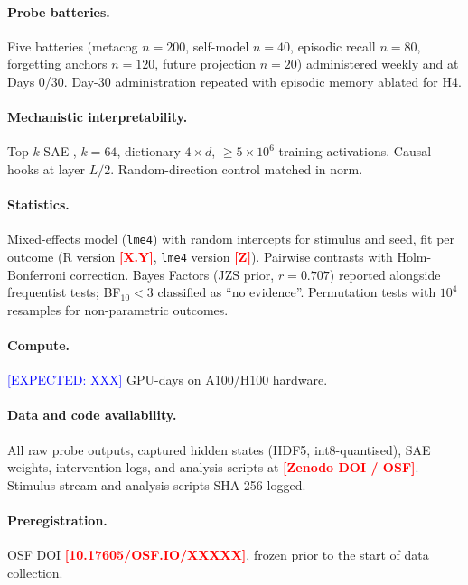 \documentclass[pdflatex,sn-mathphys-num]{sn-jnl}
\newcommand{\PLACE}[1]{\textcolor{red}{\textbf{[#1]}}}
\newcommand{\EXPECT}[1]{\textcolor{blue}{[EXPECTED: #1]}}
\theoremstyle{thmstyleone}
\theoremstyle{thmstylethree}
\begin{document}
\paragraph{Probe batteries.} Five batteries (metacog $n=200$, self-model $n=40$, episodic recall $n=80$, forgetting anchors $n=120$, future projection $n=20$) administered weekly and at Days 0/30. Day-30 administration repeated with episodic memory ablated for H4.

\paragraph{Mechanistic interpretability.} Top-$k$ SAE \cite{templeton2024scaling}, $k=64$, dictionary $4\times d$, $\geq 5{\times}10^6$ training activations. Causal hooks at layer $L/2$. Random-direction control matched in norm.

\paragraph{Statistics.} Mixed-effects model (\texttt{lme4}) with random intercepts for stimulus and seed, fit per outcome (R version \PLACE{X.Y}, \texttt{lme4} version \PLACE{Z}). Pairwise contrasts with Holm-Bonferroni correction. Bayes Factors (JZS prior, $r = 0.707$) reported alongside frequentist tests; BF$_{10} < 3$ classified as ``no evidence''. Permutation tests with $10^4$ resamples for non-parametric outcomes.

\paragraph{Compute.} \EXPECT{XXX} GPU-days on A100/H100 hardware.

\paragraph{Data and code availability.} All raw probe outputs, captured hidden states (HDF5, int8-quantised), SAE weights, intervention logs, and analysis scripts at \PLACE{Zenodo DOI / OSF}. Stimulus stream and analysis scripts SHA-256 logged.

\paragraph{Preregistration.} OSF DOI \PLACE{10.17605/OSF.IO/XXXXX}, frozen prior to the start of data collection.

\backmatter
\end{document}
